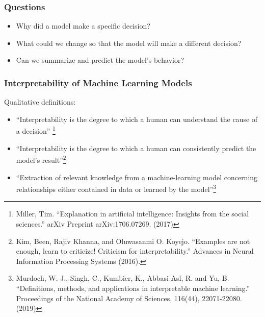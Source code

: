 \begin{frame}
  \frametitle{Questions}
  \begin{itemize}
  \item Why did a model make a specific decision?
  \item What could we change so that the model will make a different decision?
  \item Can we summarize and predict the model's behavior?
  \end{itemize}
\end{frame}

\begin{frame}
  \frametitle{Interpretability of Machine Learning Models}
  Qualitative definitions:
  \begin{itemize}
  \item ``Interpretability is the degree to which a human can understand the
    cause of a decision'' \footnote{Miller, Tim. ``Explanation in artificial
    intelligence: Insights from the social sciences.'' arXiv Preprint
    arXiv:1706.07269. (2017)}
  \item ``Interpretability is the degree to which a human can consistently
    predict the model’s result''\footnote{Kim, Been, Rajiv Khanna, and
    Oluwasanmi O. Koyejo. ``Examples are not enough, learn to criticize!
    Criticism for interpretability.'' Advances in Neural Information Processing
    Systems (2016).} 
  \item ``Extraction of relevant knowledge from a machine-learning model
    concerning relationships either contained in data or learned by the
    model''\footnote{Murdoch, W. J., Singh, C., Kumbier, K., Abbasi-Asl, R. and
    Yu, B. ``Definitions, methods, and applications in interpretable machine
    learning.'' Proceedings of the National Academy of Sciences, 116(44),
    22071-22080. (2019)} 
  \end{itemize}
\end{frame}

